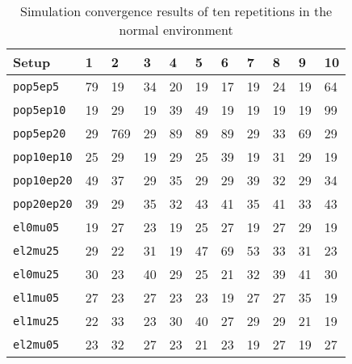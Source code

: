 \begin{table}[h!]
	\centering
	\caption[Simulation convergence results in the normal
	environment]{Simulation convergence results of ten repetitions in the normal environment}
	\label{tab:apx_conv}
	\begin{tabular}{lllllllllll}
		\hline
		\textbf{Setup} & \textbf{1} & \textbf{2} & \textbf{3} & \textbf{4} & \textbf{5} & \textbf{6} & \textbf{7} & \textbf{8} & \textbf{9} & \textbf{10} \\\hline
		\texttt{pop5ep5} & 79 & 19 & 34 & 20 & 19 & 17 & 19 & 24 & 19 & 64 \\
		\texttt{pop5ep10} & 19 & 29 & 19 & 39 & 49 & 19 & 19 & 19 & 19 & 99 \\
		\texttt{pop5ep20} & 29 & 769 & 29 & 89 & 89 & 89 & 29 & 33 & 69 & 29 \\
		\texttt{pop10ep10} & 25 & 29 & 19 & 29 & 25 & 39 & 19 & 31 & 29 & 19 \\
		\texttt{pop10ep20} & 49 & 37 & 29 & 35 & 29 & 29 & 39 & 32 & 29 & 34 \\
		\texttt{pop20ep20} & 39 & 29 & 35 & 32 & 43 & 41 & 35 & 41 & 33 & 43 \\
		\texttt{el0mu05} & 19 & 27 & 23 & 19 & 25 & 27 & 19 & 27 & 29 & 19 \\
		\texttt{el2mu25} & 29 & 22 & 31 & 19 & 47 & 69 & 53 & 33 & 31 & 23 \\
		\texttt{el0mu25} & 30 & 23 & 40 & 29 & 25 & 21 & 32 & 39 & 41 & 30 \\
		\texttt{el1mu05} & 27 & 23 & 27 & 23 & 23 & 19 & 27 & 27 & 35 & 19 \\
		\texttt{el1mu25} & 22 & 33 & 23 & 30 & 40 & 27 & 29 & 29 & 21 & 19 \\
		\texttt{el2mu05} & 23 & 32 & 27 & 23 & 21 & 23 & 19 & 27 & 19 & 27 \\
	\end{tabular}
\end{table}
